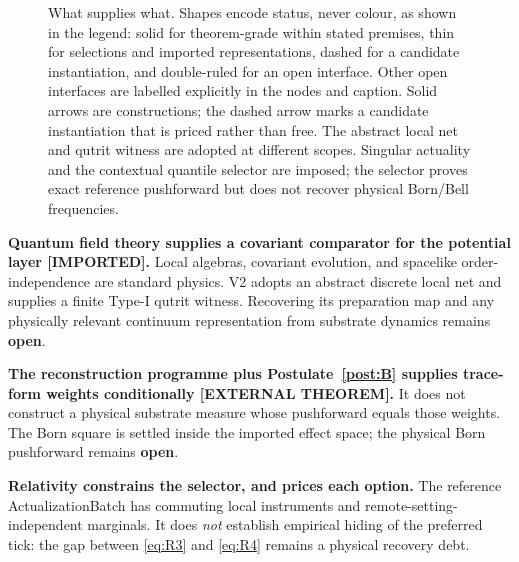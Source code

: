 \documentclass[11pt,a4paper]{article}
\newcommand{\figsub}{\scriptsize}
\theoremstyle{definition}
\theoremstyle{plain}
\theoremstyle{remark}
\begin{document}
\begin{figure}[t]
\caption{What supplies what. Shapes encode status, never colour, as shown
in the legend: solid for theorem-grade within stated premises, thin for
selections and imported representations, dashed for a candidate
instantiation, and double-ruled for an open interface. Other open
interfaces are labelled explicitly in the nodes and caption. Solid arrows
are constructions; the dashed arrow marks a candidate instantiation that
is priced rather than free. The abstract local net and qutrit witness are
adopted at different scopes. Singular actuality and the contextual quantile
selector are imposed; the selector proves exact reference pushforward but
does not recover physical Born/Bell frequencies.}
\label{fig:merge}
\end{figure}

\textbf{Quantum field theory supplies a covariant comparator for the
potential layer [IMPORTED].} Local algebras, covariant evolution, and
spacelike order-independence are standard physics. V2 adopts an abstract
discrete local net and supplies a finite Type-I qutrit witness. Recovering its
preparation map and any physically relevant continuum representation from
substrate dynamics remains \textbf{open}.

\textbf{The reconstruction programme plus Postulate~\ref{post:B} supplies
trace-form weights conditionally [EXTERNAL THEOREM].} It does not construct
a physical substrate measure whose pushforward equals those weights. The
Born square is settled inside the imported effect space; the physical Born
pushforward remains \textbf{open}.

\textbf{Relativity constrains the selector, and prices each option.}
The reference ActualizationBatch has commuting local instruments and
remote-setting-independent marginals. It does \emph{not} establish empirical
hiding of the preferred tick: the gap between \eqref{eq:R3} and
\eqref{eq:R4} remains a physical recovery debt.
\end{document}
